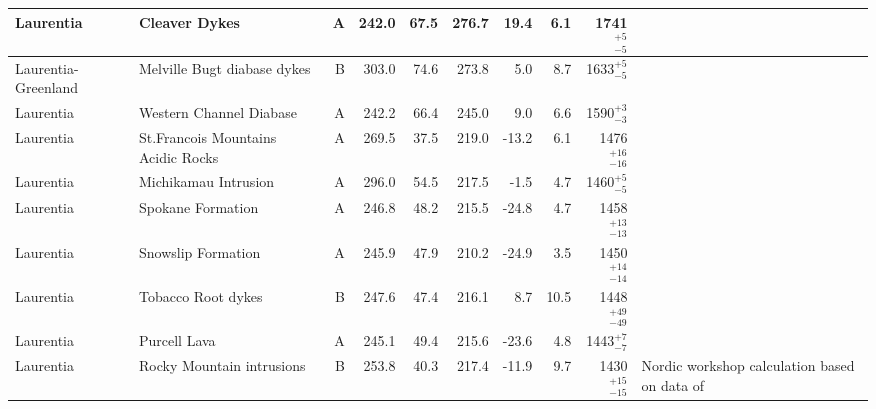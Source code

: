 \begin{longtable}{p{1 in}p{1 in}rrrrrrrp{1.5 in}}
                     Laurentia &                                    Cleaver Dykes &      A &     242.0 &      67.5 & 276.7 &  19.4 &       6.1 &     1741$^{+5}_{-5}$ &                                  \cite{Irving2004} \\ \hline
           Laurentia-Greenland &                      Melville Bugt diabase dykes &      B &     303.0 &      74.6 & 273.8 &   5.0 &       8.7 &     1633$^{+5}_{-5}$ &                                  \cite{Halls2011a} \\ \hline
                     Laurentia &                          Western Channel Diabase &      A &     242.2 &      66.4 & 245.0 &   9.0 &       6.6 &     1590$^{+3}_{-3}$ &                                  \cite{Irving1972} \\ \hline
                     Laurentia &               St.Francois Mountains Acidic Rocks &      A &     269.5 &      37.5 & 219.0 & -13.2 &       6.1 &   1476$^{+16}_{-16}$ &                                  \cite{Meert2002b} \\ \hline
                     Laurentia &                             Michikamau Intrusion &      A &     296.0 &      54.5 & 217.5 &  -1.5 &       4.7 &     1460$^{+5}_{-5}$ &                                 \cite{Emslie1976a} \\ \hline
                     Laurentia &                                Spokane Formation &      A &     246.8 &      48.2 & 215.5 & -24.8 &       4.7 &   1458$^{+13}_{-13}$ &                                 \cite{Elston2002a} \\ \hline
                     Laurentia &                               Snowslip Formation &      A &     245.9 &      47.9 & 210.2 & -24.9 &       3.5 &   1450$^{+14}_{-14}$ &                                 \cite{Elston2002a} \\ \hline
                     Laurentia &                               Tobacco Root dykes &      B &     247.6 &      47.4 & 216.1 &   8.7 &      10.5 &   1448$^{+49}_{-49}$ &                                 \cite{Harlan2008a} \\ \hline
                     Laurentia &                                     Purcell Lava &      A &     245.1 &      49.4 & 215.6 & -23.6 &       4.8 &     1443$^{+7}_{-7}$ &                                 \cite{Elston2002a} \\ \hline
                     Laurentia &                        Rocky Mountain intrusions &      B &     253.8 &      40.3 & 217.4 & -11.9 &       9.7 &   1430$^{+15}_{-15}$ &  Nordic workshop calculation based on data of \cite{Harlan1994a,Harlan1998a} \\ \hline

\end{longtable}
